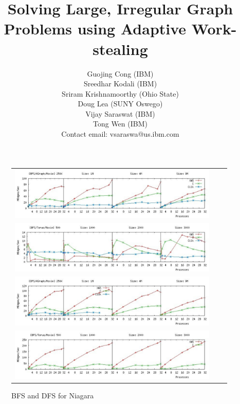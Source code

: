 \documentclass[10pt]{ieee}
\numberwithin{equation}{section}
\begin{document}
\title{Solving Large, Irregular Graph Problems using Adaptive Work-stealing}

\author{
Guojing Cong (IBM)\\ 
Sreedhar Kodali (IBM)\\
Sriram Krishnamoorthy (Ohio State) \\
Doug Lea (SUNY Oswego)\\
Vijay Saraswat (IBM)\\
Tong Wen (IBM)\\
Contact email: vsaraswa@us.ibm.com\\ 
}

\date{}

\maketitle
\thispagestyle{empty}




%

%


%
%

{\footnotesize


}

\begin{figure}
 \begin{tabular}{ccc}
\includegraphics[width=10cm]{plots/bfs-kgraph-moxie-color.pdf} \\
\includegraphics[width=10cm]{plots/bfs-torus-moxie-color.pdf} \\
\includegraphics[width=10cm]{plots/dfs-kgraph-moxie-color.pdf}\\
\includegraphics[width=10cm]{plots/dfs-torus-moxie-color.pdf}\\

 \end{tabular}
\caption{BFS and DFS for Niagara}\label{moxie}
\end{figure}
\end{document}
